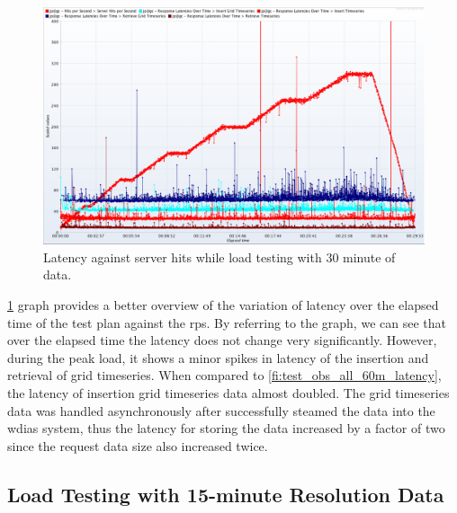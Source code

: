 \begin{figure}[htp]
    \centering
    \includegraphics[width=1.0\textwidth]{results/obs/all/obs_all_30m_res_latencies_against_hits.png}
    \caption{Latency against server hits while load testing with 30 minute of data.}
    \label{fi:test_obs_all_30m_latency}
\end{figure}
\cref{fi:test_obs_all_30m_latency} graph provides a better overview of the variation of latency over the elapsed time of the test plan against the \acrshort{rps}. By referring to the graph, we can see that over the elapsed time the latency does not change very significantly. However, during the peak load, it shows a minor spikes in latency of the insertion and retrieval of grid timeseries. When compared to \cref{fi:test_obs_all_60m_latency}, the latency of insertion grid timeseries data almost doubled. The grid timeseries data was handled asynchronously after successfully steamed the data into the \acrshort{wdias} system, thus the latency for storing the data increased by a factor of two since the request data size also increased twice.


\subsection{Load Testing with 15-minute Resolution Data}
\label{subse:obs_test_plan_all_15min}

